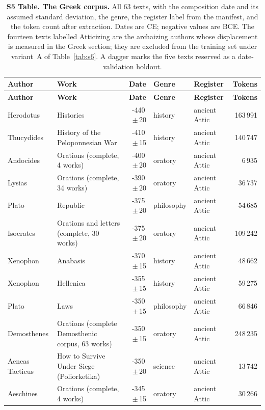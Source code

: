 \begingroup\footnotesize
\setlength{\tabcolsep}{3pt}
\begin{longtable}{p{2.6cm}p{4.1cm}rll r}
\caption{{\bf S5 Table. The Greek corpus.}  All 63 texts, with the composition date and its assumed standard deviation, the genre, the register label from the manifest, and the token count after extraction.  Dates are CE; negative values are BCE.  The fourteen texts labelled Atticizing are the archaizing authors whose displacement is measured in the Greek section; they are excluded from the training set under variant~A of Table~\ref{tab:s6}.  A dagger marks the five texts reserved as a date-validation holdout.}
\label{tab:s5}\\
\toprule
\textbf{Author} & \textbf{Work} & \textbf{Date} & \textbf{Genre} & \textbf{Register} & \textbf{Tokens} \\
\midrule
\endfirsthead
\toprule
\textbf{Author} & \textbf{Work} & \textbf{Date} & \textbf{Genre} & \textbf{Register} & \textbf{Tokens} \\
\midrule
\endhead
\bottomrule
\endfoot
Herodotus & Histories & -440\,$\pm$\,20 & history & ancient Attic & 163\,991 \\
Thucydides & History of the Peloponnesian War & -410\,$\pm$\,15 & history & ancient Attic & 140\,747 \\
Andocides & Orations (complete, 4 works) & -400\,$\pm$\,20 & oratory & ancient Attic & 6\,935 \\
Lysias & Orations (complete, 34 works) & -390\,$\pm$\,20 & oratory & ancient Attic & 36\,737 \\
Plato & Republic & -375\,$\pm$\,20 & philosophy & ancient Attic & 54\,685 \\
Isocrates & Orations and letters (complete, 30 works) & -375\,$\pm$\,20 & oratory & ancient Attic & 109\,242 \\
Xenophon & Anabasis & -370\,$\pm$\,15 & history & ancient Attic & 48\,662 \\
Xenophon & Hellenica & -355\,$\pm$\,15 & history & ancient Attic & 59\,275 \\
Plato & Laws & -350\,$\pm$\,15 & philosophy & ancient Attic & 66\,846 \\
Demosthenes & Orations (complete Demosthenic corpus, 63 works) & -350\,$\pm$\,15 & oratory & ancient Attic & 248\,235 \\
Aeneas Tacticus & How to Survive Under Siege (Poliorketika) & -350\,$\pm$\,20 & science & ancient Attic & 13\,742 \\
Aeschines & Orations (complete, 4 works) & -345\,$\pm$\,15 & oratory & ancient Attic & 30\,266 \\

\end{longtable}
